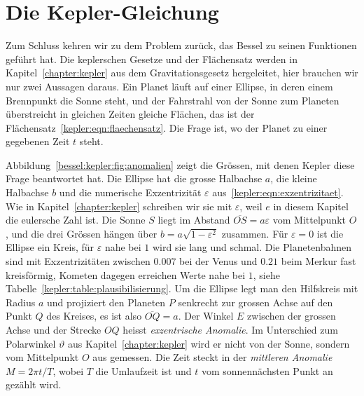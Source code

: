 %
%
%
%
\section{Die Kepler-Gleichung
\label{bessel:section:kepler}}
Zum Schluss kehren wir zu dem Problem zurück, das Bessel zu seinen Funktionen geführt hat.
%
Die keplerschen Gesetze und der Flächensatz werden in Kapitel~\ref{chapter:kepler} aus dem Gravitationsgesetz hergeleitet, hier brauchen wir nur zwei Aussagen daraus.
Ein Planet läuft auf einer Ellipse, in deren einem Brennpunkt die Sonne steht, und der Fahrstrahl von der Sonne zum Planeten überstreicht in gleichen Zeiten gleiche Flächen, das ist der Flächensatz~\eqref{kepler:eqn:flaechensatz}.
%
%
Die Frage ist, wo der Planet zu einer gegebenen Zeit $t$ steht.

Abbildung~\ref{bessel:kepler:fig:anomalien} zeigt die Grössen, mit denen Kepler diese Frage beantwortet hat.
Die Ellipse hat die grosse Halbachse $a$, die kleine Halbachse $b$ und die numerische Exzentrizität $\varepsilon$ aus~\eqref{kepler:eqn:exzentrizitaet}.
%
%
Wie in Kapitel~\ref{chapter:kepler} schreiben wir sie mit $\varepsilon$, weil $e$ in diesem Kapitel die eulersche Zahl ist.
Die Sonne $S$ liegt im Abstand $\overline{OS}=a\varepsilon$ vom Mittelpunkt $O$, und die drei Grössen hängen über $b=a\sqrt{1-\varepsilon^2}$ zusammen.
Für $\varepsilon=0$ ist die Ellipse ein Kreis, für $\varepsilon$ nahe bei $1$ wird sie lang und schmal.
Die Planetenbahnen sind mit Exzentrizitäten zwischen $0.007$ bei der Venus und $0.21$ beim Merkur fast kreisförmig, Kometen dagegen erreichen Werte nahe bei $1$, siehe Tabelle~\ref{kepler:table:plausibilisierung}.
Um die Ellipse legt man den Hilfskreis mit Radius $a$ und projiziert den Planeten $P$ senkrecht zur grossen Achse auf den Punkt $Q$ des Kreises, es ist also $\overline{OQ}=a$.
%
Der Winkel $E$ zwischen der grossen Achse und der Strecke $OQ$ heisst \emph{exzentrische Anomalie}.
%
Im Unterschied zum Polarwinkel $\vartheta$ aus Kapitel~\ref{chapter:kepler} wird er nicht von der Sonne, sondern vom Mittelpunkt $O$ aus gemessen.
Die Zeit steckt in der \emph{mittleren Anomalie}
%
$M=2\pi t/T$, wobei $T$ die Umlaufzeit ist und $t$ vom sonnennächsten Punkt an gezählt wird.


